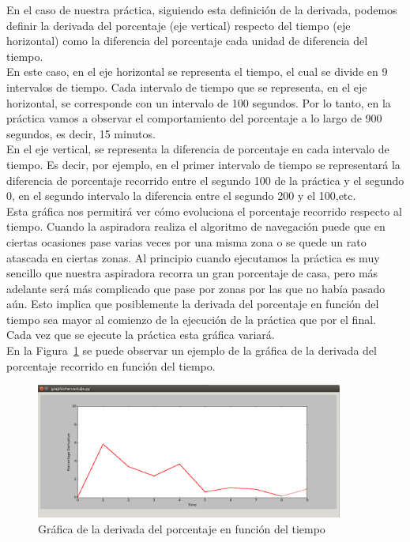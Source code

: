 En el caso de nuestra práctica, siguiendo esta definición de la derivada, podemos definir la derivada del porcentaje (eje vertical) respecto del tiempo (eje horizontal) como la diferencia del porcentaje cada unidad de diferencia del tiempo.\\

En este caso, en el eje horizontal se representa el tiempo, el cual se divide en 9 intervalos de tiempo. Cada intervalo de tiempo que se representa, en el eje horizontal, se corresponde con un intervalo de 100 segundos. Por lo tanto, en la práctica vamos a observar el comportamiento del porcentaje a lo largo de 900 segundos, es decir, 15 minutos.\\

En el eje vertical, se representa la diferencia de porcentaje en cada intervalo de tiempo. Es decir, por ejemplo, en el primer intervalo de tiempo se representará la diferencia de porcentaje recorrido entre el segundo 100 de la práctica y el segundo 0, en el segundo intervalo la diferencia entre el segundo 200 y el 100,etc.\\

Esta gráfica nos permitirá ver cómo evoluciona el porcentaje recorrido respecto al tiempo. Cuando la aspiradora realiza el algoritmo de navegación puede que en ciertas ocasiones pase varias veces por una misma zona o se quede un rato atascada en ciertas zonas. Al principio cuando ejecutamos la práctica es muy sencillo que nuestra aspiradora recorra un gran porcentaje de casa, pero más adelante será más complicado que pase por zonas por las que no había pasado aún. Esto implica que posiblemente la derivada del porcentaje en función del tiempo sea mayor al comienzo de la ejecución de la práctica que por el final. Cada vez que se ejecute la práctica esta gráfica variará.\\

En la Figura~\ref{fig.grafica_percentaje2} se puede observar un ejemplo de la gráfica de la derivada del porcentaje recorrido en función del tiempo.\\

\begin{figure}[H]
  \begin{center}
    \includegraphics[width=0.9\textwidth]{figures/Vacuum/Grafica_percentaje2.png}
		\caption{Gráfica de la derivada del porcentaje en función del tiempo}
		\label{fig.grafica_percentaje2}
		\end{center}
\end{figure}

